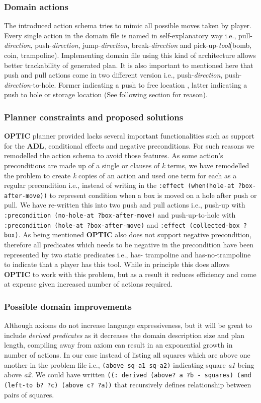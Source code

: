 \documentclass[letterpaper]{article} %
\begin{document}
\subsubsection{Domain actions}
The introduced action schema tries to mimic all possible moves taken by player. Every single action in the domain file is named in self-explanatory way i.e., pull-\emph{direction}, push-\emph{direction}, jump-\emph{direction}, break-\emph{direction} and pick-up-\emph{tool}(bomb, coin, trampoline). Implementing domain file using this kind of architecture allows better trackability of generated plan. It is also important to mentioned here that push and pull actions come in two different version i.e., push-\emph{direction}, push-\emph{direction}-to-hole. Former indicating a push to free location , latter indicating a push to hole or storage location (See following section for reason).

\subsubsection{Planner constraints and proposed solutions}
\textbf{OPTIC} planner provided lacks several important functionalities such as support for the \textbf{ADL}, conditional effects and negative preconditions. For such reasons we remodelled the action schema to avoid those features. As some action’s preconditions are made up of a single or clauses of \emph{k} terms, we have remodelled the problem to create \emph{k} copies of an action and used one term for each as a regular precondition i.e., instead of writing in the \texttt{:effect (when(hole-at ?box-after-move))} to represent condition when a box is moved on a hole after push or pull. We have re-written this into two push and pull actions i.e., push-up with \texttt{:precondition (no-hole-at ?box-after-move)} and push-up-to-hole with \texttt{:precondition (hole-at ?box-after-move)} and \texttt{:effect (collected-box ?box)}. As being mentioned \textbf{OPTIC}  also does not support negative precondition, therefore all predicates which needs to be negative in the precondition have been represented by two static predicates i.e., has- trampoline and has-no-trampoline to indicate that a player has this tool. While in principle this does allows \textbf{OPTIC} to work with this problem, but as a result it reduces efficiency and come at expense given increased number of actions required.   

\subsubsection{Possible domain improvements}
Although axioms do not increase language expressiveness, but it will be great to include \emph{derived predicates} as it decreases the domain description size and plan length, compiling away from axiom can result in an exponential growth in number of actions. In our case instead of listing all squares which are above one another in the problem file i.e., \texttt{(above sq-a1 sq-a2)} indicating square \emph{a1} being above \emph{a2}. We could have written \texttt{((: derived (above? a ?b - squares) (and (left-to b?  ?c) (above c? ?a))} that recursively defines relationship between pairs of squares.   
\end{document}
